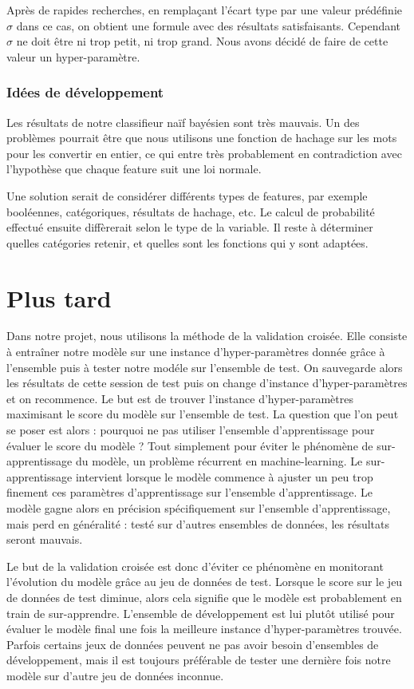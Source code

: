 \documentclass[french, 14pt]{memoir}
\begin{document}
Après de rapides recherches, en remplaçant l'écart type par une valeur prédéfinie $\sigma$ dans ce cas, on obtient une formule avec des résultats satisfaisants. Cependant $\sigma$ ne doit être ni trop petit, ni trop grand. Nous avons décidé de faire de cette valeur un hyper-paramètre.


\subsection{Idées de développement}

Les résultats de notre classifieur naïf bayésien sont très mauvais. Un des problèmes pourrait être que nous utilisons une fonction de hachage sur les mots pour les convertir en entier, ce qui entre très probablement en contradiction avec l'hypothèse que chaque feature suit une loi normale.

Une solution serait de considérer différents types de features, par exemple booléennes, catégoriques, résultats de hachage, etc. Le calcul de probabilité effectué ensuite diffèrerait selon le type de la variable. Il reste à déterminer quelles catégories retenir, et quelles sont les fonctions qui y sont adaptées.

\chapter*{Plus tard}

Dans notre projet, nous utilisons la méthode de la validation croisée. Elle consiste à entraîner notre modèle sur une instance d'hyper-paramètres donnée grâce à l'ensemble puis à tester notre modéle sur l'ensemble de test. On sauvegarde alors les résultats de cette session de test puis on change d'instance d'hyper-paramètres et on recommence. Le but est de trouver l'instance d'hyper-paramètres maximisant le score du modèle sur l'ensemble de test.
La question que l'on peut se poser est alors : pourquoi ne pas utiliser l'ensemble d'apprentissage pour évaluer le score du modèle ? 
Tout simplement pour éviter le phénomène de sur-apprentissage du modèle, un problème récurrent en machine-learning. Le sur-apprentissage intervient lorsque le modèle commence à ajuster un peu trop finement ces paramètres d'apprentissage sur l'ensemble d'apprentissage. Le modèle gagne alors en précision spécifiquement sur l'ensemble d'apprentissage, mais perd en généralité : testé sur d'autres ensembles de données, les résultats seront mauvais.

Le but de la validation croisée est donc d'éviter ce phénomène en monitorant l'évolution du modèle grâce au jeu de données de test. Lorsque le score sur le jeu de données de test diminue, alors cela signifie que le modèle est probablement en train de sur-apprendre. 
L'ensemble de développement est lui plutôt utilisé pour évaluer le modèle final une fois la meilleure instance d'hyper-paramètres trouvée. Parfois certains jeux de données peuvent ne pas avoir besoin d'ensembles de développement, mais il est toujours préférable de tester une dernière fois notre modèle sur d'autre jeu de données inconnue. 
\end{document}
